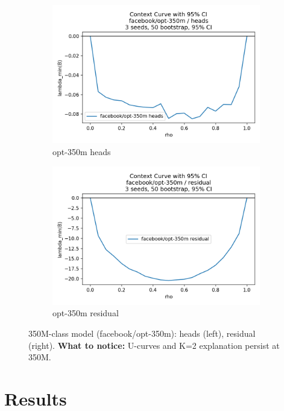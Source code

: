 \documentclass[11pt]{article}
\newcommand{\1}{\mathbf{1}}
\begin{document}
\begin{figure}[t]
\centering
\begin{subfigure}[t]{0.48\textwidth}
\includegraphics[width=\linewidth]{figs/curve_facebook_opt-350m_heads.png}
\caption{opt-350m heads}
\end{subfigure}\hfill
\begin{subfigure}[t]{0.48\textwidth}
\includegraphics[width=\linewidth]{figs/curve_facebook_opt-350m_residual.png}
\caption{opt-350m residual}
\end{subfigure}
\caption{350M-class model (facebook/opt-350m): heads (left), residual (right). \textbf{What to notice:} U-curves and K{=}2 explanation persist at 350M.}
\label{fig:curve_opt350m}
\end{figure}

\section{Results}
\FloatBarrier
\end{document}
